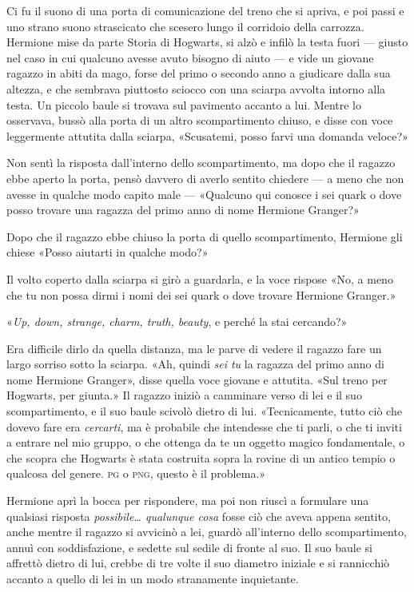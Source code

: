 Ci fu il suono di una porta di comunicazione del treno che si apriva, e poi passi e uno strano suono strascicato che scesero lungo il corridoio della carrozza. Hermione mise da parte Storia di Hogwarts, si alzò e infilò la testa fuori — giusto nel caso in cui qualcuno avesse avuto bisogno di aiuto — e vide un giovane ragazzo in abiti da mago, forse del primo o secondo anno a giudicare dalla sua altezza, e che sembrava piuttosto sciocco con una sciarpa avvolta intorno alla testa. Un piccolo baule si trovava sul pavimento accanto a lui. Mentre lo osservava, bussò alla porta di un altro scompartimento chiuso, e disse con voce leggermente attutita dalla sciarpa, «Scusatemi, posso farvi una domanda veloce?»

Non sentì la risposta dall’interno dello scompartimento, ma dopo che il ragazzo ebbe aperto la porta, pensò davvero di averlo sentito chiedere — a meno che non avesse in qualche modo capito male — «Qualcuno qui conosce i sei quark o dove posso trovare una ragazza del primo anno di nome Hermione Granger?»

Dopo che il ragazzo ebbe chiuso la porta di quello scompartimento, Hermione gli chiese «Posso aiutarti in qualche modo?»

Il volto coperto dalla sciarpa si girò a guardarla, e la voce rispose «No, a meno che tu non possa dirmi i nomi dei sei quark o dove trovare Hermione Granger.»

«\textit{Up, down, strange, charm, truth, beauty}, e perché la stai cercando?»

Era difficile dirlo da quella distanza, ma le parve di vedere il ragazzo fare un largo sorriso sotto la sciarpa. «Ah, quindi \textit{sei tu} la ragazza del primo anno di nome Hermione Granger», disse quella voce giovane e attutita. «Sul treno per Hogwarts, per giunta.» Il ragazzo iniziò a camminare verso di lei e il suo scompartimento, e il suo baule scivolò dietro di lui. «Tecnicamente, tutto ciò che dovevo fare era \textit{cercarti}, ma è probabile che intendesse che ti parli, o che ti inviti a entrare nel mio gruppo, o che ottenga da te un oggetto magico fondamentale, o che scopra che Hogwarts è stata costruita sopra la rovine di un antico tempio o qualcosa del genere. \textsc{pg} o \textsc{png}, questo è il problema.»

Hermione aprì la bocca per rispondere, ma poi non riuscì a formulare una qualsiasi risposta \textit{possibile… qualunque cosa} fosse ciò che aveva appena sentito, anche mentre il ragazzo si avvicinò a lei, guardò all’interno dello scompartimento, annuì con soddisfazione, e sedette sul sedile di fronte al suo. Il suo baule si affrettò dietro di lui, crebbe di tre volte il suo diametro iniziale e si rannicchiò accanto a quello di lei in un modo stranamente inquietante.

